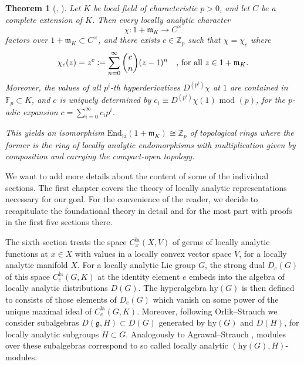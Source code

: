 \documentclass[a4paper, reqno, 10pt]{amsart}
\newtheorem{theoremalphabetical}{Theorem}[section]
\theoremstyle{definition}
\numberwithin{equation}{section}
\newcommand{\defeq}{\vcentcolon=}
\newcommand{\End}{{\mathrm{End}}}
\newcommand{\hy}{{\mathrm{hy}}}
\newcommand{\la}{{\mathrm{la}}}
\newcommand{\lra}{\longrightarrow}
\renewcommand{\mod}{{\,\,\mathrm{mod}\,\,}}
\newcommand{\unts}{^{\times}}
\newcommand{\BF}{{\mathbb {F}}}
\newcommand{\BZ}{{\mathbb {Z}}}
\newcommand{\Fg}{{\mathfrak {g}}}
\newcommand{\Fm}{{\mathfrak {m}}}
\begin{document}
\begin{theoremalphabetical}[, ]
	Let $K$ be local field of characteristic $p>0$, and let $C$ be a complete extension of $K$.
	Then every locally analytic character
	\begin{equation*}
		\chi \colon 1 + \Fm_K \lra C\unts 
	\end{equation*}
	factors over $1+ \Fm_K \subset C\unts$, and there exists $c\in \BZ_p$ such that $\chi = \chi_c$ where
	\begin{equation*}
		\chi_c (z) = z^c \defeq \sum_{n=0}^\infty \binom{c}{n} (z-1)^n \quad\text{, for all $z\in 1 +\Fm_K $.}
	\end{equation*}
	Moreover, the values of all $p^i$-th hyperderivatives $D^{(p^i)}\chi$ at $1$ are contained in $\BF_p \subset K$, and $c$ is uniquely determined by $c_i \equiv D^{(p^i)} \chi(1) \mod (p)$, for the $p$-adic expansion $c=\sum_{i= 0}^\infty c_i p^i$.
	
	
	This yields an isomorphism $\End_{\la}(1+\Fm_K) \cong \BZ_p$ of topological rings where the former is the ring of locally analytic endomorphisms with multiplication given by composition and carrying the compact-open topology.
\end{theoremalphabetical}







We want to add more details about the content of some of the individual sections.
The first chapter covers the theory of locally analytic representations necessary for our goal.
For the convenience of the reader, we decide to recapitulate the foundational theory in detail and for the most part with proofs in the first five sections there.



The sixth section treats the space $C^\la_x(X,V)$ of germs of locally analytic functions at $x \in X$ with values in a locally convex vector space $V$, for a locally analytic manifold $X$.
For a locally analytic Lie group $G$, the strong dual $D_e(G)$ of this space $C^\la_e(G,K)$ at the identity element $e$ embeds into the algebra of locally analytic distributions $D(G)$.
The hyperalgebra $\hy(G)$ is then defined to consists of those elements of $D_e(G)$ which vanish on some power of the unique maximal ideal of $C^\la_e(G,K)$.
Moreover, following Orlik--Strauch \cite{OrlikStrauch15JordanHoelderSerLocAnRep} we consider subalgebras $D(\Fg,H) \subset D(G)$ generated by $\hy(G)$ and $D(H)$, for locally analytic subgroups $H\subset G$.
Analogously to Agrawal--Strauch \cite{AgrawalStrauch22FromCatOLocAnRep}, modules over these subalgebras correspond to so called locally analytic $(\hy(G), H)$-modules.
\end{document}
